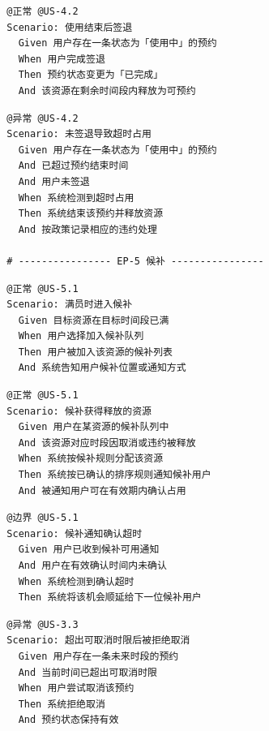 \documentclass[11pt,a4paper]{article}
\begin{document}
\begin{framed}
\small
\begin{verbatim}
  @正常 @US-4.2
  Scenario: 使用结束后签退
    Given 用户存在一条状态为「使用中」的预约
    When 用户完成签退
    Then 预约状态变更为「已完成」
    And 该资源在剩余时间段内释放为可预约
\end{verbatim}
\end{framed}

\begin{framed}
\small
\begin{verbatim}
  @异常 @US-4.2
  Scenario: 未签退导致超时占用
    Given 用户存在一条状态为「使用中」的预约
    And 已超过预约结束时间
    And 用户未签退
    When 系统检测到超时占用
    Then 系统结束该预约并释放资源
    And 按政策记录相应的违约处理

  # ---------------- EP-5 候补 ----------------
\end{verbatim}
\end{framed}

\begin{framed}
\small
\begin{verbatim}
  @正常 @US-5.1
  Scenario: 满员时进入候补
    Given 目标资源在目标时间段已满
    When 用户选择加入候补队列
    Then 用户被加入该资源的候补列表
    And 系统告知用户候补位置或通知方式
\end{verbatim}
\end{framed}

\begin{framed}
\small
\begin{verbatim}
  @正常 @US-5.1
  Scenario: 候补获得释放的资源
    Given 用户在某资源的候补队列中
    And 该资源对应时段因取消或违约被释放
    When 系统按候补规则分配该资源
    Then 系统按已确认的排序规则通知候补用户
    And 被通知用户可在有效期内确认占用
\end{verbatim}
\end{framed}

\begin{framed}
\small
\begin{verbatim}
  @边界 @US-5.1
  Scenario: 候补通知确认超时
    Given 用户已收到候补可用通知
    And 用户在有效确认时间内未确认
    When 系统检测到确认超时
    Then 系统将该机会顺延给下一位候补用户
\end{verbatim}
\end{framed}

\begin{framed}
\small
\begin{verbatim}
  @异常 @US-3.3
  Scenario: 超出可取消时限后被拒绝取消
    Given 用户存在一条未来时段的预约
    And 当前时间已超出可取消时限
    When 用户尝试取消该预约
    Then 系统拒绝取消
    And 预约状态保持有效
\end{verbatim}
\end{framed}
\end{document}
